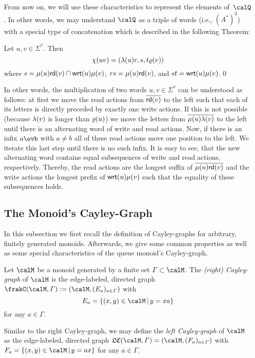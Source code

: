 From now on, we will use these characteristics to represent the elements of~$\Qx$. In other words, we may understand $\Qx$ as a triple of words (i.e., $(A^*)^3$) with a special type of concatenation which is described in the following Theorem:

\begin{theorem}\label{thm:concat}
	Let $u,v\in\varSigma^*$. Then
	\[\chi(uv)=(\lambda(u)r,s,t\varrho(v))\]
	where $s=\mu(u)\mathsf{rd}(v)\sqcap\mathsf{wrt}(u)\mu(v)$, $rs=\mu(u)\mathsf{rd}(v)$, and $st=\mathsf{wrt}(u)\mu(v)$.\qed
\end{theorem}

In other words, the multiplication of two words $u,v\in\varSigma^*$ can be understood as follows: at first we move the read actions from $\overline{\mathsf{rd}(v)}$ to the left such that each of its letters is directly preceded by exactly one write actions. If this is not possible (because $\lambda(v)$ is longer than $\varrho(u)$) we move the letters from $\overline{\mu(u)\lambda(v)}$ to the left until there is an alternating word of write and read actions. Now, if there is an infix $a\ovb$ with $a\neq b$ all of these read actions move one position to the left. We iterate this last step until there is no such infix. It is easy to see, that the new alternating word contains equal subsequences of write and read actions, respectively. Thereby, the read actions are the longest suffix of $\overline{\mu(u)\mathsf{rd}(v)}$ and the write actions the longest prefix of $\mathsf{wrt}(u)\mu(v)$ such that the equality of these subsequences holds.

\subsection{The Monoid's Cayley-Graph}
In this subsection we first recall the definition of Cayley-graphs for arbitrary, finitely generated monoids. Afterwards, we give some common properties as well as some special characteristics of the queue monoid's Cayley-graph.

\begin{definition}
	Let $\calM$ be a monoid generated by a finite set $\varGamma\subset\calM$. The \emph{(right) Cayley-graph} of $\calM$ is the edge-labeled, directed graph $\cayley{\calM}{\varGamma}:=(\calM,(E_a)_{a\in\varGamma})$ with
	\[E_a=\{(x,y)\in\calM\,|\,y=xa\}\]
	for any $a\in\varGamma$.
\end{definition}

Similar to the right Cayley-graph, we may define the \emph{left Cayley-graph} of $\calM$ as the edge-labeled, directed graph $\lcayley{\calM}{\varGamma}=(\calM,(F_a)_{a\in\varGamma})$ with $F_a=\{(x,y)\in\calM\,|\,y=ax\}$ for any $a\in\varGamma$.


